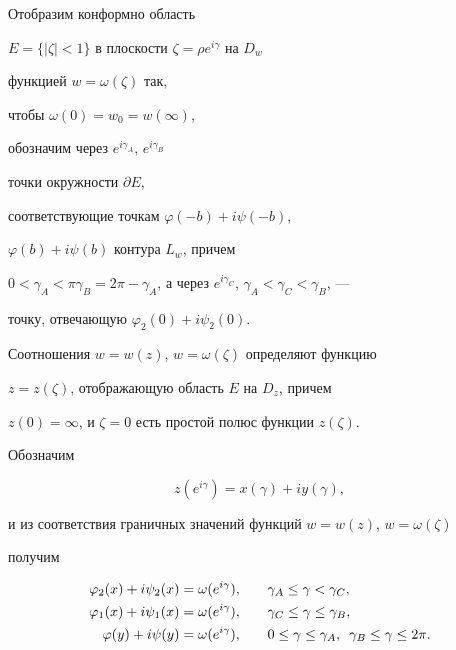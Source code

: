Отобразим конформно область


$E=\{|\zeta|<1\}$ в плоскости $\zeta =\rho e^{i\gamma}$ на $D_{w}$ 


функцией $w=\omega (\zeta)$ так,


чтобы $\omega (0) = w_{0}=w(\infty)$,


обозначим через $e^{i\gamma_{A}}$, $e^{i\gamma_{B}}$ 


точки окружности $\partial E$, 


соответствующие точкам $\varphi(-b)+i\psi(-b)$,


$\varphi(b)+i\psi(b)$ контура $L_{w}$, причем 


$0 <\gamma_{A} <\pi \gamma_{B}=2\pi -


\gamma_{A}$, а через $e^{i\gamma_{C}}$, $\gamma_{A} <


\gamma_{C} <\gamma_{B}$, --- 


точку, отвечающую $\varphi_{2}(0)+i\psi_{2}(0)$.





Соотношения $w=w(z)$, $w=\omega (\zeta)$ определяют функцию


$z=z(\zeta)$, отображающую область $E$ на $D_{z}$, причем


$z(0)=\infty$, и $\zeta=0$ есть простой полюс функции $z(\zeta)$.





Обозначим


\begin{equation} \label{2.0}


z(e^{i\gamma})=x(\gamma)+iy(\gamma),


\end{equation}


и из соответствия граничных значений функций $w=w(z)$, $w=\omega (\zeta)$


получим


\begin{alignat}{2}


\varphi_{2}(x)+i\psi_{2}(x)&=\omega (e^{i\gamma}),&\quad&\gamma_{A}


\leq\gamma<\gamma_{C},\notag \\


%


\label{2.1}


\varphi_{1}(x)+i\psi_{1}(x)&=\omega (e^{i\gamma}),&\quad&\gamma_{C}


\leq\gamma\leq\gamma_{B},\\


%


\varphi(y)+i\psi(y)&=\omega (e^{i\gamma}),&\quad &0\leq\gamma\leq


\gamma_{A},\ \,


\gamma_{B}\leq\gamma\leq 2\pi.\notag


\end{alignat}





